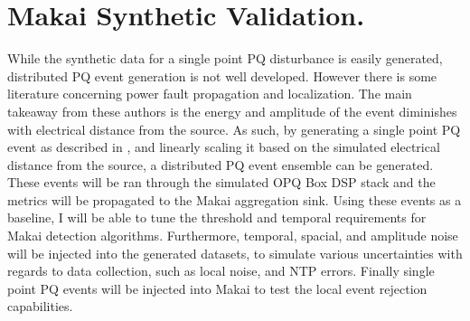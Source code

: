 \section{Makai Synthetic Validation.}
While the synthetic data for a single point PQ disturbance is easily generated, distributed PQ event generation is not well developed. However there is some literature concerning power fault propagation and localization. \cite{parsons1998direction} \cite{polajvzer2017evaluation} The main takeaway from these authors is the energy and amplitude of the event diminishes with electrical distance from the source. As such, by generating a single point PQ event as described in \cite{kumar2015power}\cite{tan2013simulation}, and linearly scaling it based on the simulated electrical distance from the source, a distributed PQ event ensemble can be generated. These events will be ran through the simulated OPQ Box DSP stack and the metrics will be propagated to the Makai aggregation sink. Using these events as a baseline, I will be able to tune the threshold and temporal requirements for Makai detection algorithms. Furthermore, temporal, spacial, and amplitude noise will be injected into the generated datasets, to simulate various uncertainties with regards to data collection, such as local noise, and NTP errors. Finally single point PQ events will be injected into Makai to test the local event rejection capabilities.


